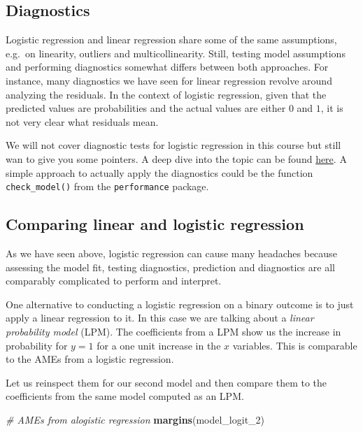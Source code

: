 \documentclass[
]{book}
\newenvironment{Shaded}{\begin{snugshade}}{\end{snugshade}}
\newcommand{\CommentTok}[1]{\textcolor[rgb]{0.56,0.35,0.01}{\textit{#1}}}
\newcommand{\FunctionTok}[1]{\textcolor[rgb]{0.13,0.29,0.53}{\textbf{#1}}}
\newcommand{\NormalTok}[1]{#1}
\begin{document}
\hypertarget{diagnostics}{%
\subsection{Diagnostics}\label{diagnostics}}

Logistic regression and linear regression share some of the same
assumptions, e.g.~on linearity, outliers and multicollinearity.
Still, testing model assumptions and performing diagnostics somewhat differs
between both approaches. For instance, many diagnostics we have seen for linear
regression revolve around analyzing the residuals.
In the context of logistic regression, given that the
predicted values are probabilities and the actual values are either \(0\)
and \(1\), it is not very clear what residuals mean.

We will not cover diagnostic tests for logistic regression in this course but
still wan to give you some pointers.
A deep dive into the topic can be found
\href{http://www.sthda.com/english/articles/36-classification-methods-essentials/148-logistic-regression-assumptions-and-diagnostics-in-r/}{here}.
A simple approach to actually apply the diagnostics could be the function
\texttt{check\_model()} from the \texttt{performance} package.

\hypertarget{comparing-linear-and-logistic-regression}{%
\subsection{Comparing linear and logistic regression}\label{comparing-linear-and-logistic-regression}}

As we have seen above, logistic regression can cause many headaches
because assessing the model fit, testing diagnostics, prediction and
diagnostics are all comparably complicated to perform and interpret.

One alternative to conducting a logistic regression on a binary outcome is to
just apply a linear regression to it. In this case we are talking about a
\emph{linear probability model} (LPM). The coefficients from a LPM show us the
increase in probability for \(y = 1\) for a one unit increase in the \(x\)
variables. This is comparable to the AMEs from a logistic regression.

Let us reinspect them for our second model and then compare them to the
coefficients from the same model computed as an LPM.

\begin{Shaded}
\begin{Highlighting}[]
\CommentTok{\# AMEs from alogistic regression}
\FunctionTok{margins}\NormalTok{(model\_logit\_2)}
\end{Highlighting}
\end{Shaded}
\end{document}
